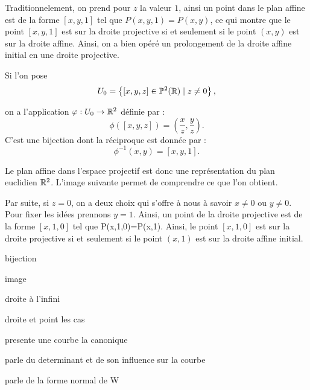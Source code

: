 Traditionnelement, on prend pour $z$ la valeur $1$, ainsi un point dans le plan affine est de
la forme $\left[ x,y,1 \right] $ tel que $P(x,y,1)=P(x,y)$, ce qui montre que le point $\left[
x,y,1\right] $ est sur la droite projective si et seulement si le point $(x,y)$ est sur la
droite affine. Ainsi, on a bien opéré un prolongement de la droite affine initial en une droite
projective.

Si l'on pose 
\[
U_0 = \left\{ [x,y,z] \in \mathbb{P}^2(\mathbb{R}) \mid z \neq 0 \right\} 
,\] 

on a l'application $\varphi : U_0 \to \mathbb{R}^2$ définie par :
\[
\phi([x,y,z]) = \left( \frac{x}{z},\frac{y}{z} \right)
.\] 
C'est une bijection dont la réciproque est donnée par :
\[
\phi^{-1}(x,y) = [x,y,1]
.\] 

Le plan affine dans l'espace projectif est donc une représentation du plan euclidien $\mathbb{R}^2$.
L'image suivante permet de comprendre ce que l'on obtient.

Par suite, si $z=0$, on a deux choix qui s'offre à nous à savoir $x \neq 0$ ou $y \neq 0$. Pour
fixer les idées prennons $y = 1$. Ainsi, un point de la droite projective est de la forme
$\left[ x,1,0 \right] $ tel que P(x,1,0)=P(x,1). Ainsi, le point $[x,1,0]$ est sur la droite
projective si et seulement si le point $(x,1)$ est sur la droite affine initial. 




bijection 

image

droite à l'infini

droite et point les cas

presente une courbe la canonique

parle du determinant et de son influence sur la courbe

parle de la forme normal de W




